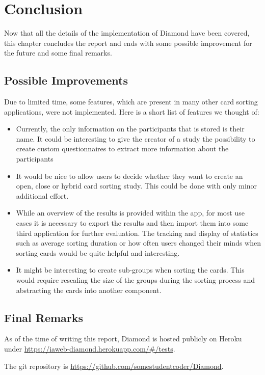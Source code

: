 \chapter{Conclusion}

\label{chap:Concl}

Now that all the details of the implementation of Diamond have been covered, 
this chapter concludes the report and ends with some possible improvement for 
the future and some final remarks.

\section{Possible Improvements}

Due to limited time, some features, which are present in many other card 
sorting applications, were not implemented. Here is a short list of features we 
thought of:

\begin{itemize}
  \item Currently, the only information on the participants that is stored is 
  their name. It could be interesting to give the creator of a study the 
  possibility to create custom questionnaires  to extract more information 
  about the participants
  \item It would be nice to allow users to decide whether they want to create 
  an open, close or hybrid card sorting study. This could be done with only 
  minor additional effort. 
  \item While an overview of the results is provided within the app, for most 
  use cases it is necessary to export the results and then import them into some
  third application for further evaluation. The tracking and display of 
  statistics such as average sorting duration or how often users changed their 
  minds when sorting cards would be quite helpful and interesting.
  \item It might be interesting to create sub-groups when sorting the cards. 
  This would require rescaling the size of the groups during the sorting process
  and abstracting the cards into another component.
\end{itemize}



\section{Final Remarks}

As of the time of writing this report, Diamond is hosted publicly on Heroku 
under \url{https://iaweb-diamond.herokuapp.com/#/tests}.

The git repository is 
\url{https://github.com/somestudentcoder/Diamond}.


